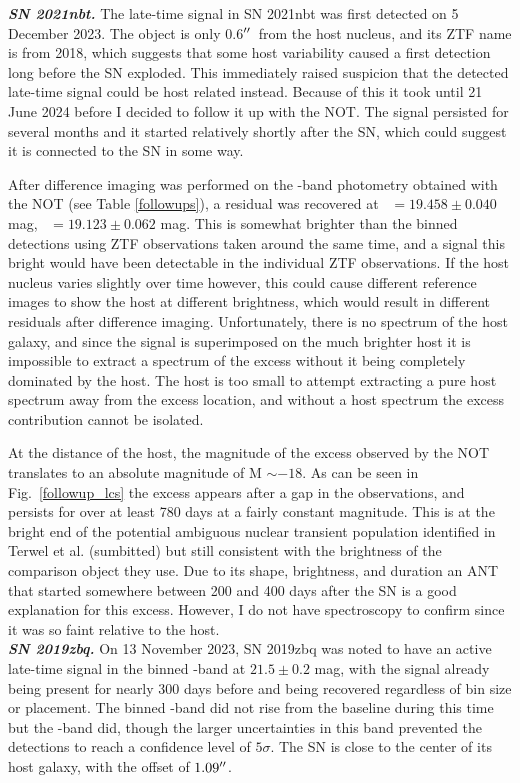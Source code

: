\documentclass[a4paper,oneside,12pt, class=Latex/Classes/PhDthesisPSnPDF, crop=false]{standalone}
\begin{document}
\textit{\textbf{SN 2021nbt.}}
The late-time signal in SN 2021nbt was first detected on 5 December 2023. The object is only 0.6$^{\prime\prime}$\ from the host nucleus, and its ZTF name is from 2018, which suggests that some host variability caused a first detection long before the SN exploded. This immediately raised suspicion that the detected late-time signal could be host related instead. Because of this it took until 21 June 2024 before I decided to follow it up with the NOT. The signal persisted for several months and it started relatively shortly after the SN, which could suggest it is connected to the SN in some way.

After difference imaging was performed on the \ztfr\ztfi-band photometry obtained with the NOT (see Table \ref{followups}), a residual was recovered at \ztfr\ $= 19.458\pm0.040$ mag, \ztfi\ $= 19.123\pm0.062$ mag. This is somewhat brighter than the binned detections using ZTF observations taken around the same time, and a signal this bright would have been detectable in the individual ZTF observations. If the host nucleus varies slightly over time however, this could cause different reference images to show the host at different brightness, which would result in different residuals after difference imaging. Unfortunately, there is no spectrum of the host galaxy, and since the signal is superimposed on the much brighter host it is impossible to extract a spectrum of the excess without it being completely dominated by the host. The host is too small to attempt extracting a pure host spectrum away from the excess location, and without a host spectrum the excess contribution cannot be isolated.

At the distance of the host, the magnitude of the excess observed by the NOT translates to an absolute magnitude of M $\sim -18$. As can be seen in Fig.~\ref{followup_lcs} the excess appears after a gap in the observations, and persists for over at least 780 days at a fairly constant magnitude. This is at the bright end of the potential ambiguous nuclear transient \citep{2020ohl_Hinkle} population identified in Terwel et al. (sumbitted) but still consistent with the brightness of the comparison object they use. Due to its shape, brightness, and duration an ANT that started somewhere between 200 and 400 days after the SN is a good explanation for this excess. However, I do not have spectroscopy to confirm since it was so faint relative to the host.\\


\textit{\textbf{SN 2019zbq.}}
On 13 November 2023, SN 2019zbq was noted to have an active late-time signal in the binned \ztfr-band at $21.5\pm0.2$ mag, with the signal already being present for nearly 300 days before and being recovered regardless of bin size or placement. The binned \ztfg-band did not rise from the baseline during this time but the \ztfi-band did, though the larger uncertainties in this band prevented the detections to reach a confidence level of $5\sigma$. The SN is close to the center of its host galaxy, with the offset of $1.09^{\prime\prime}$.
\end{document}
